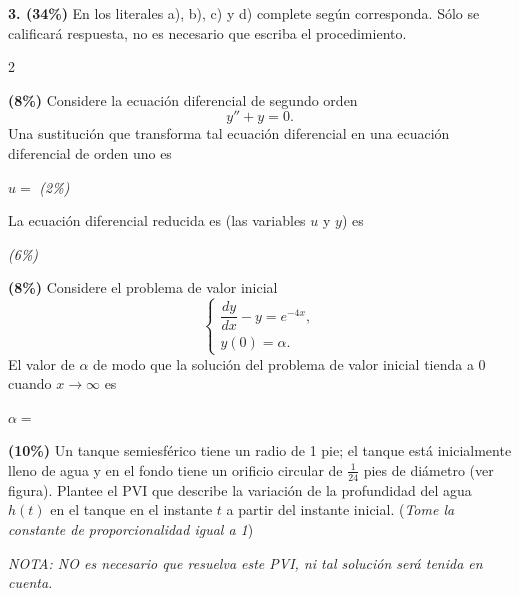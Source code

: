 \documentclass[11pt]{article}
\begin{document}
\newpage

\noindent\textbf{3. (34\%)} En los literales a), b), c) y d) complete según corresponda. Sólo se calificará respuesta, no es necesario que escriba el procedimiento.

\begin{multicols}{2}

\begin{opciones}
\item[a)] \textbf{(8\%)} Considere la ecuación diferencial de segundo orden
\[
y''+y=0.
\]
Una sustitución que transforma tal ecuación diferencial en una ecuación diferencial de orden uno es

$u=$ \underline{\hspace{2.5cm}} \textit{(2\%)}

La ecuación diferencial reducida es (las variables $u$ y $y$) es

\underline{\hspace{4.5cm}} \textit{(6\%)}

\item[b)] \textbf{(8\%)} Considere el problema de valor inicial
\[
\begin{cases}
\dfrac{dy}{dx}-y=e^{-4x}, \\
y(0)=\alpha.
\end{cases}
\tag{1}
\]
El valor de $\alpha$ de modo que la solución del problema de valor inicial tienda a $0$ cuando $x\to\infty$ es

$\alpha=$ \underline{\hspace{2.5cm}}

\item[c)] \textbf{(10\%)} Un tanque semiesférico tiene un radio de 1 pie; el tanque está inicialmente lleno de agua y en el fondo tiene un orificio circular de $\frac{1}{24}$ pies de diámetro (ver figura). Plantee el PVI que describe la variación de la profundidad del agua $h(t)$ en el tanque en el instante $t$ a partir del instante inicial. (\textit{Tome la constante de proporcionalidad igual a 1})

\textit{NOTA: NO es necesario que resuelva este PVI, ni tal solución será tenida en cuenta.}

\begin{center}
\end{center}


\end{opciones}
\end{multicols}
\end{document}
